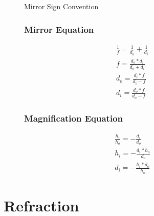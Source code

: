 \documentclass{article}
\begin{document}
\begin{figure}[ht]
    \centering
    \caption{Mirror Sign Convention}
    \label{fig:mirror_sign}
\end{figure}

\begin{figure}[ht]
    \begin{minipage}[t]{0.4\linewidth}
        \subsubsection{Mirror Equation}
        \begin{gather}
            \frac{1}{f} = \frac{1}{d_o} + \frac{1}{d_i} \\
            f = \frac{d_o*d_i}{d_o + d_i} \\
            d_o = \frac{d_i*f}{d_i - f} \\
            d_i = \frac{d_o*f}{d_o - f}
        \end{gather}
    \end{minipage}
    \hfill\vline\hfill
    \begin{minipage}[t]{0.4\linewidth}
        \subsubsection{Magnification Equation}
        \begin{gather}
            \frac{h_i}{h_o} = -\frac{d_i}{d_o} \\
            h_i = -\frac{d_i*h_o}{d_o} \\
            d_i = -\frac{h_i*d_o}{h_o}
        \end{gather}
    \end{minipage}
\end{figure}

\section{Refraction}
\end{document}
